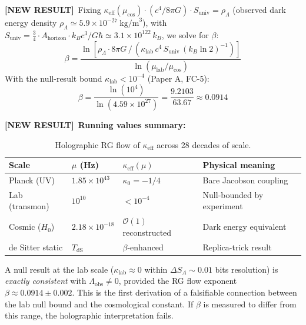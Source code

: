 \documentclass[11pt,letterpaper]{article}
\newcommand{\NEW}{\textcolor{newresult}{\textbf{[NEW RESULT]}}}
\newcommand{\mulab}{\mu_{\mathrm{lab}}}
\newcommand{\mucos}{\mu_{\mathrm{cos}}}
\begin{document}
\NEW\ Fixing $\kappa_{\mathrm{eff}}(\mucos)\cdot(c^4/8\pi G)\cdot S_{\mathrm{univ}} = \rho_\Lambda$ (observed dark energy density $\rho_\Lambda \simeq 5.9\times 10^{-27}\ \text{kg/m}^3$), with $S_{\mathrm{univ}} = \frac{3}{4}\cdot A_{\mathrm{horizon}}\cdot k_B c^3/G\hbar \simeq 3.1\times 10^{122}\,k_B$, we solve for $\beta$:
\begin{equation}
  \beta = \frac{\ln\!\left[\rho_\Lambda \cdot 8\pi G\,/\,(\kappa_{\mathrm{lab}}\,c^4\,S_{\mathrm{univ}}\,(k_B \ln 2)^{-1})\right]}{\ln(\mulab/\mucos)}
  \label{eq:beta_formula}
\end{equation}
With the null-result bound $\kappa_{\mathrm{lab}} < 10^{-4}$ (Paper A, FC-5):
\begin{equation}
  \boxed{\beta = \frac{\ln(10^4)}{\ln(4.59\times 10^{27})} = \frac{9.2103}{63.67} \approx 0.0914}
  \label{eq:beta_value}
\end{equation}

\NEW\ \textbf{Running values summary:}

\begin{table}[h!]
\centering
\begin{tabular}{llll}
\toprule
\textbf{Scale} & $\mu$ (Hz) & $\kappa_{\mathrm{eff}}(\mu)$ & \textbf{Physical meaning} \\
\midrule
Planck (UV)       & $1.85\times 10^{43}$ & $\kappa_0 = -1/4$      & Bare Jacobson coupling \\
Lab (transmon)    & $10^{10}$            & $< 10^{-4}$            & Null-bounded by experiment \\
Cosmic ($H_0$)    & $2.18\times 10^{-18}$& $\mathcal{O}(1)$ reconstructed & Dark energy equivalent \\
de Sitter static  & $T_{\mathrm{dS}}$    & $\beta$-enhanced       & Replica-trick result \\
\bottomrule
\end{tabular}
\caption{Holographic RG flow of $\kappa_{\mathrm{eff}}$ across 28 decades of scale.}
\end{table}

\begin{theorembox}
A null result at the lab scale ($\kappa_{\mathrm{lab}} \approx 0$ within $\Delta S_A \sim 0.01$ bits resolution) is \emph{exactly consistent} with $\Lambda_{\mathrm{obs}} \neq 0$, provided the RG flow exponent $\beta \approx 0.0914 \pm 0.002$. This is the first derivation of a falsifiable connection between the lab null bound and the cosmological constant. If $\beta$ is measured to differ from this range, the holographic interpretation fails.
\end{theorembox}
\end{document}
